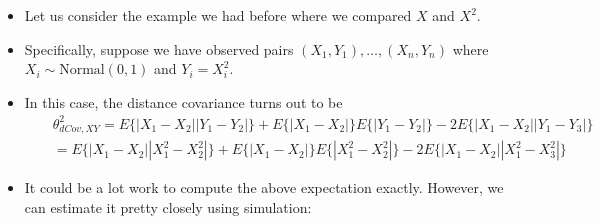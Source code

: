 \documentclass[]{book}
\begin{document}
\begin{itemize}
\item
  Let us consider the example we had before where we compared \(X\) and \(X^{2}\).
\item
  Specifically, suppose we have observed pairs \((X_{1}, Y_{1}), \ldots, (X_{n},Y_{n})\)
  where \(X_{i} \sim \textrm{Normal}(0, 1)\) and \(Y_{i} = X_{i}^{2}\).
\item
  In this case, the distance covariance turns out to be
  \begin{eqnarray}
  &&\theta_{dCov,XY}^{2} 
  = E\Big\{ |X_{1} - X_{2}| |Y_{1} - Y_{2}|  \Big\} + E\Big\{ |X_{1} - X_{2}| \Big\}E\Big\{ |Y_{1} - Y_{2}| \Big\} - 2E\Big\{ |X_{1} - X_{2}||Y_{1} - Y_{3}| \Big\} \nonumber \\
  &&= E\Big\{ |X_{1} - X_{2}| |X_{1}^{2} - X_{2}^{2}|  \Big\} + E\Big\{ |X_{1} - X_{2}| \Big\}E\Big\{ |X_{1}^{2} - X_{2}^{2}| \Big\} - 2E\Big\{ |X_{1} - X_{2}||X_{1}^{2} - X_{3}^{2}| \Big\} \nonumber 
  \end{eqnarray}
\item
  It could be a lot work to compute the above expectation exactly. However,
  we can estimate it pretty closely using simulation:
\end{itemize}
\end{document}

